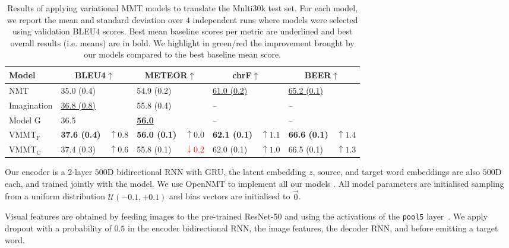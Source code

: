 \documentclass[11pt,a4paper]{article}
\newcommand{\red}[1]{\textcolor{Red}{#1}}
\newcommand{\green}[1]{\textcolor{OliveGreen}{#1}}
\newcommand{\cond}{VMMT$_{\text{C}}$\xspace}
\newcommand{\uncond}{VMMT$_{\text{F}}$\xspace}
\begin{document}
\begin{table*}[t!]
\centering
\begin{tabular}{lllllllll}
\toprule
{\bf Model} & \multicolumn{2}{c}{\bf BLEU4$\uparrow$} & \multicolumn{2}{c}{\bf METEOR$\uparrow$} & \multicolumn{2}{c}{\bf chrF$\uparrow$} & \multicolumn{2}{c}{\bf BEER$\uparrow$} \\
\midrule
NMT  &
	35.0 (0.4) && 54.9 (0.2) && \underline{61.0 (0.2)} && \underline{65.2 (0.1)} \\
Imagination &
	\underline{36.8 (0.8)} &&  55.8 (0.4) && -- && -- \\
Model G &
	36.5 && \underline{{\bf 56.0}} && -- && -- \\
    
\midrule

\uncond  &
	{\bf 37.6 (0.4)} & \green{$\uparrow 0.8$} &
    {\bf 56.0 (0.1)} & \green{$\uparrow 0.0$} &
    {\bf 62.1 (0.1)} & \green{$\uparrow 1.1$} &
    {\bf 66.6 (0.1)} & \green{$\uparrow 1.4$} \\
\cond  &
	37.4 (0.3) & \green{$\uparrow 0.6$} &
    55.8 (0.1) & \red{$\downarrow 0.2$} &
    62.0 (0.1) & \green{$\uparrow 1.0$} &
    66.5 (0.1) & \green{$\uparrow 1.3$} \\
\bottomrule
\end{tabular}
\caption{Results of applying variational MMT models to translate the Multi30k test set. For each model, we report the mean and standard deviation over $4$ independent runs where models were selected using validation BLEU4 scores. Best mean baseline scores per metric are underlined and best overall results (i.e. means) are in bold. We highlight in green/red the improvement brought by our models compared to the best baseline mean score.}
\label{tab:main_results}
\end{table*}


Our encoder is a 2-layer $500$D bidirectional RNN with GRU, the latent embedding $z$, source, and target word embeddings are also $500$D each, and trained jointly with the model.
We use OpenNMT to implement all our models \citep{opennmt}.
All model parameters are initialised sampling from a uniform distribution $\mathcal{U}(-0.1,+0.1)$ and bias vectors are initialised to $\vec{0}$.

Visual features are obtained by feeding images to the pre-trained ResNet-50 and using the activations of the \texttt{pool5} layer~\cite{He2015}.
We apply dropout with a probability of $0.5$ in the encoder bidirectional RNN, the image features, the decoder RNN, and before emitting a target word.
\end{document}
